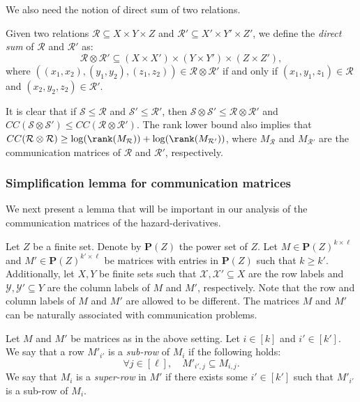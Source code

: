 \documentclass[acmsmall, nonacm, authorversion]{acmart}
\begin{document}
We also need the notion of direct sum of two relations.

\begin{definition}\label{def:direct-sum-relations}
Given two relations $\mathcal{R} \subseteq X \times Y \times Z$ and $\mathcal{R}' \subseteq X' \times Y' \times Z'$, we define the \emph{direct sum} of $\mathcal{R}$ and $\mathcal{R}'$ as:
\[
\mathcal{R} \otimes \mathcal{R}' \subseteq (X \times X') \times (Y \times Y') \times (Z \times Z'),
\]
where $((x_1, x_2), (y_1, y_2), (z_1, z_2)) \in \mathcal{R} \otimes \mathcal{R}'$ if and only if $(x_1, y_1, z_1) \in \mathcal{R}$ and $(x_2, y_2, z_2) \in \mathcal{R}'$.
\end{definition}

It is clear that if $\mathcal{S}\le\mathcal{R}$ and $\mathcal{S}'\le\mathcal{R}'$, then
$\mathcal{S} \otimes \mathcal{S}'\le\mathcal{R}\otimes \mathcal{R}'$ and $CC(\mathcal{S} \otimes \mathcal{S}')\leq CC(\mathcal{R}\otimes \mathcal{R}')$. The rank lower bound \cite[Lemma 1.28]{KN97} also implies that $
CC(\mathcal{R} \otimes \mathcal{R}) \ge \log(\rank(M_{\mathcal{R}}))+\log(\rank(M_{\mathcal{R}'}))$, where $M_{\mathcal{R}}$ and $M_{\mathcal{R}'}$ are the communication matrices of $\mathcal{R}$ and $\mathcal{R}'$, respectively.

\subsubsection{Simplification lemma for communication matrices}\label{subsec:simplification-lem}
We next present a lemma that will be important in our analysis of the communication matrices of the hazard-derivatives. 

Let $Z$ be a finite set. Denote by $\mathbf{P}(Z)$ the power set of $Z$. Let $M\in \mathbf{P}(Z)^{k\times \ell}$ and $M'\in \mathbf{P}(Z)^{k'\times \ell}$ be matrices with entries in $\mathbf{P}(Z)$ such that $k\ge k'$. Additionally, let $X,Y$ be finite sets such that $\mathcal{X}, \mathcal{X}'\subseteq X$ are the row labels and $\mathcal{Y}, \mathcal{Y}'\subseteq Y$ are the column labels of $M$ and $M'$, respectively. Note that the row and column labels of $M$ and $M'$ are allowed to be different.
The matrices $M$ and $M'$ can be naturally associated with communication problems. 

\begin{definition}\label{def:sub-row-super-row}
Let $M$ and $M'$ be matrices as in the above setting. Let $i\in[k]$ and $i'\in[k']$. We say that a row $M'_{i'}$ is a \emph{sub-row} of $M_i$ if the following holds:
\[
\forall j\in [\ell], \quad M'_{i',j}\subseteq M_{i,j}.
\]
We say that $M_i$ is a \emph{super-row} in $M'$ if there exists some $i'\in[k']$ such that $M'_{i'}$ is a sub-row of $M_i$.
\end{definition}
\end{document}
